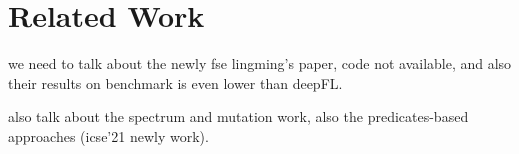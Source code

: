 \section{Related Work}
we need to talk about the newly fse lingming's paper, code not available, and also their results on benchmark is even lower than deepFL.

also talk about the spectrum and mutation work, also the predicates-based approaches (icse'21 newly work).

